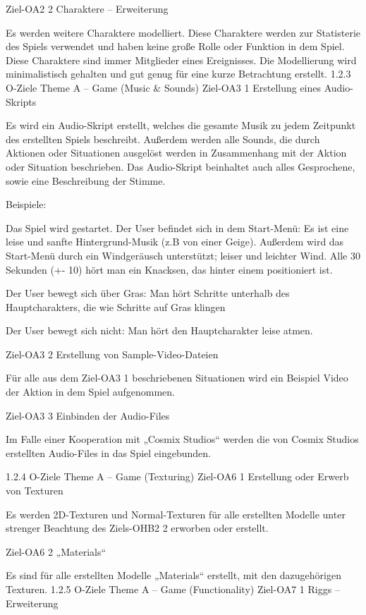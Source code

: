 Ziel-OA2 2	Charaktere – Erweiterung

Es werden weitere Charaktere modelliert. Diese Charaktere werden zur Statisterie des Spiels verwendet und haben keine große Rolle oder Funktion in dem Spiel. Diese Charaktere sind immer Mitglieder eines Ereignisses. Die Modellierung wird minimalistisch gehalten und gut genug für eine kurze Betrachtung erstellt.
1.2.3	O-Ziele Theme A – Game (Music & Sounds)
Ziel-OA3 1	Erstellung eines Audio-Skripts

Es wird ein Audio-Skript erstellt, welches die gesamte Musik zu jedem Zeitpunkt des erstellten Spiels beschreibt. Außerdem werden alle Sounds, die durch Aktionen oder Situationen ausgelöst werden in Zusammenhang mit der Aktion oder Situation beschrieben. Das Audio-Skript beinhaltet auch alles Gesprochene, sowie eine Beschreibung der Stimme.

Beispiele:

Das Spiel wird gestartet. Der User befindet sich in dem Start-Menü:
Es ist eine leise und sanfte Hintergrund-Musik (z.B von einer Geige). Außerdem wird das Start-Menü durch ein Windgeräusch unterstützt; leiser und leichter Wind. Alle 30 Sekunden (+- 10) hört man ein Knacksen, das hinter einem positioniert ist.

			Der User bewegt sich über Gras:
Man hört Schritte unterhalb des Hauptcharakters, die wie Schritte auf Gras klingen

			Der User bewegt sich nicht:
				Man hört den Hauptcharakter leise atmen.

	Ziel-OA3 2 	Erstellung von Sample-Video-Dateien

Für alle aus dem Ziel-OA3 1 beschriebenen Situationen wird ein Beispiel Video der Aktion in dem Spiel aufgenommen.

	Ziel-OA3 3	Einbinden der Audio-Files

Im Falle einer Kooperation mit „Cosmix Studios“ werden die von Cosmix Studios erstellten Audio-Files in das Spiel eingebunden.

1.2.4	O-Ziele Theme A – Game (Texturing)
	Ziel-OA6 1	Erstellung oder Erwerb von Texturen

Es werden 2D-Texturen und Normal-Texturen für alle erstellten Modelle unter strenger Beachtung des Ziels-OHB2 2 erworben oder erstellt.

	Ziel-OA6 2	„Materials“

Es sind für alle erstellten Modelle „Materials“ erstellt, mit den dazugehörigen Texturen.
1.2.5	O-Ziele Theme A – Game (Functionality)
Ziel-OA7 1	Riggs – Erweiterung

